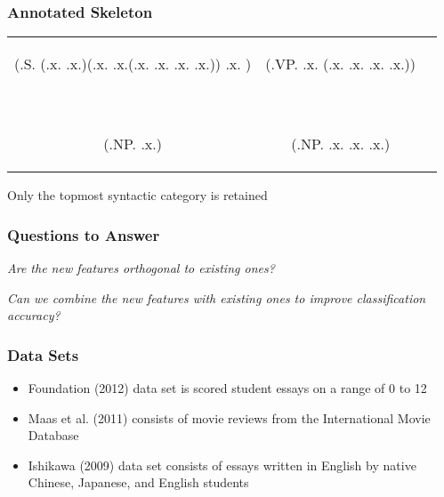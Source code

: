 \documentclass[handouti]{beamer}
\begin{document}
\begin{frame}[fragile]
    \frametitle{Annotated Skeleton}
    \begin{center}
    \begin{tabular}{ccc}
        \begin{parsetree}
            (.S. (.x. .x.)(.x. .x.(.x. .x. .x. .x.)) .x. )
        \end{parsetree} &
        \begin{parsetree}
            (.VP. .x. (.x. .x. .x. .x.))
        \end{parsetree} \\
        ~ & ~ \\
        \begin{parsetree}
            (.NP. .x.)
        \end{parsetree} &
        \begin{parsetree}
            (.NP. .x. .x. .x.)
        \end{parsetree} \\
    \end{tabular}

    \vspace{.2in}
    {\normalsize
    Only the topmost syntactic category is retained}
    \end{center}
\end{frame}

\begin{frame}
    \frametitle{Questions to Answer}
    \emph{Are the new features orthogonal to existing ones?}

    \vspace{.5in}
    \emph{Can we combine the new features with existing ones to improve
    classification accuracy?}
\end{frame}

\begin{frame}
    \frametitle{Data Sets}
    \begin{itemize}
        \itemsep1.5em
        \item Foundation (2012) data set is scored student essays on a range of
            0 to 12
        \item Maas et al. (2011) consists of movie reviews from the
            International Movie Database
        \item Ishikawa (2009) data set consists of essays written in English by
            native Chinese, Japanese, and English students
    \end{itemize}
\end{frame}
\end{document}
